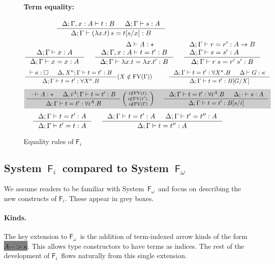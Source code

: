 \documentclass{llncs}
\newcommand{\newFi}[1]{\colorbox{grey}{\ensuremath{#1}}}
\newcommand{\Fi}{\ensuremath{\mathsf{F}_i}}
\newcommand{\Fw}{\ensuremath{\mathsf{F}_\omega}}
\newcommand{\FV}{\mathop{\mathrm{FV}}}
\begin{document}
\begin{figure}
\paragraph{Term equality:} ~~ 
$ \qquad
 ~~~~
   \inference{\Delta;\Gamma,x:A |- t:B & \Delta;\Gamma |- s:A}
             {\Delta;\Gamma |- (\lambda x.t)\,s=t[s/x] : B} $
\[
   \inference{\Delta;\Gamma |- x:A}{\Delta;\Gamma |- x=x:A}
 ~~~~
   \inference{\quad~~ \Delta |- A:* \\ \Delta;\Gamma,x:A |- t=t':B}
             {\Delta;\Gamma |- \lambda x.t = \lambda x.t':B}
 ~~~~
   \inference{\Delta;\Gamma |- r=r':A-> B \\ \Delta;\Gamma |- s=s':A \qquad~}
             {\Delta;\Gamma |- r\;s=r'\;s':B}
\]
\[ \inference{|- \kappa:\square & \Delta, X^\kappa;\Gamma |- t=t' : B}
             {\Delta;\Gamma |- t=t' : \forall X^\kappa.B}
	     (X\notin\FV(\Gamma))
 ~~~~ ~~~~
   \inference{ \Delta;\Gamma |- t=t' : \forall X^\kappa.B
             & \Delta |- G:\kappa }
             {\Delta;\Gamma |- t=t' : B[G/X]}
\]
\[ \newFi{
   \inference{\cdot |- A:* & \Delta, i^A;\Gamma |- t=t' : B}
             {\Delta;\Gamma |- t=t' : \forall i^A.B}
   \left(\begin{smallmatrix}
		i\notin\FV(t),\\
		i\notin\FV(t'),\\
		i\notin\FV(\Gamma)\end{smallmatrix}\right)
 ~~~~
   \inference{ \Delta;\Gamma |- t=t' : \forall i^A.B
             & \Delta;\cdot |- s:A}
             {\Delta;\Gamma |- t=t' : B[s/i]} }
\]
\[ \inference{\Delta;\Gamma |- t=t':A}{\Delta;\Gamma |- t'=t:A}
 ~~~~
   \inference{\Delta;\Gamma |- t=t':A & \Delta;\Gamma |- t'=t'':A}
             {\Delta;\Gamma |- t=t'':A}
\]
\caption{Equality rules of \Fi}
\label{fig:eqFi}
\end{figure}

\subsection{System~\Fi\ compared to System~\Fw} \label{ssec:newFi}
We assume readers to be familiar with System~\Fw\
and focus on describing the new constructs of \Fi.
These appear in grey boxes.

\paragraph{Kinds.}
The key extension to \Fw\ is the addition of term-indexed arrow kinds of
the form \newFi{A -> \kappa}. This allows type constructors to have terms
as indices. The rest of the development of \Fi\ flows naturally from
this single extension.
\end{document}
